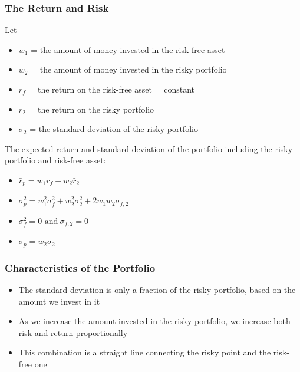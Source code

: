 \documentclass[9pt,aspectratio=169]{beamer}
\begin{document}
\begin{frame}

\frametitle{\textnormal{The Return and Risk}}
Let
\begin{itemize}
\item $w_1$ = the amount of money invested in the risk-free asset
\item $w_2$ = the amount of money invested in the risky portfolio
\item $r_f$ = the return on the risk-free asset = constant
\item $r_2$ = the return on the risky portfolio
\item $\sigma_2$ = the standard deviation of the risky portfolio
\end{itemize}
The expected return and standard deviation of the portfolio including the risky portfolio and risk-free asset:
\setlength{\parindent}{0.5cm}
\begin{itemize}
    \item $\bar{r}_p = w_1 r_f + w_2 \bar{r}_2$
    \item $\sigma_p^2 = w_1^2 \sigma_f^2 + w_2^2 \sigma_2^2+2w_1 w_2 \sigma_{f,2}$
    \item $\sigma_f^2=0 \text{ and}  \ \sigma_{f,2}=0$
    \item $\sigma_p =w_2 \sigma_2$
\end{itemize}
\end{frame}

\begin{frame}

\frametitle{\textnormal{Characteristics of the Portfolio}}

\begin{itemize}
    \item The standard deviation is only a fraction of the risky portfolio, based on the amount we invest in it
\item As we increase the amount invested in the risky portfolio, we increase both risk and return proportionally 
\item This combination is a straight line connecting the risky point and the risk-free one

\end{itemize}


\end{frame}
\end{document}
